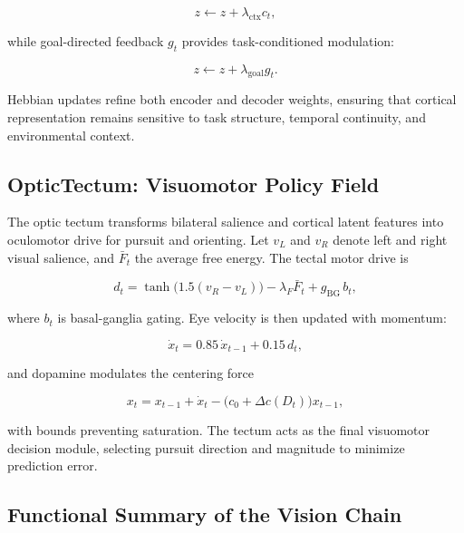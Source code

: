 \documentclass[9pt]{elife}
\begin{document}
\begin{equation}
z \leftarrow z + \lambda_{\mathrm{ctx}} c_t,
\end{equation}

while goal-directed feedback $g_t$ provides task-conditioned modulation:

\begin{equation}
z \leftarrow z + \lambda_{\mathrm{goal}} g_t.
\end{equation}

Hebbian updates refine both encoder and decoder weights, ensuring that cortical
representation remains sensitive to task structure, temporal continuity, and
environmental context.

\subsection{OpticTectum: Visuomotor Policy Field}

The optic tectum transforms bilateral salience and cortical latent features into
oculomotor drive for pursuit and orienting.  
Let $v_L$ and $v_R$ denote left and right visual salience, and $\bar{F}_t$ the
average free energy.  
The tectal motor drive is

\begin{equation}
d_t = \tanh\!\big(1.5(v_R - v_L)\big)
      - \lambda_F \bar{F}_t
      + g_{\mathrm{BG}}\, b_t,
\end{equation}

where $b_t$ is basal-ganglia gating.  
Eye velocity is then updated with momentum:

\begin{equation}
\dot{x}_t = 0.85\,\dot{x}_{t-1} + 0.15\, d_t,
\end{equation}

and dopamine modulates the centering force

\begin{equation}
x_t = x_{t-1} + \dot{x}_t
      - \big(c_0 + \Delta c(D_t)\big) x_{t-1},
\end{equation}

with bounds preventing saturation.  
The tectum acts as the final visuomotor decision module, selecting pursuit
direction and magnitude to minimize prediction error.

\subsection{Functional Summary of the Vision Chain}
\end{document}
